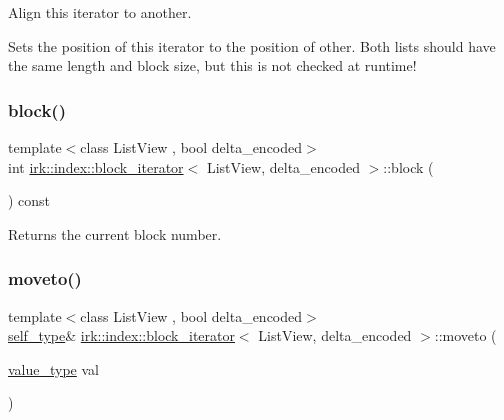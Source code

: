 Align this iterator to another. 

Sets the position of this iterator to the position of {\ttfamily other}. Both lists should have the same length and block size, but this is not checked at runtime! \mbox{\label{classirk_1_1index_1_1block__iterator_afc0c06615fcd46d243bccd2a6a77ffeb}} 
\subsubsection{\texorpdfstring{block()}{block()}}
{\footnotesize\ttfamily template$<$class List\+View , bool delta\+\_\+encoded$>$ \\
int \mbox{\hyperlink{classirk_1_1index_1_1block__iterator}{irk\+::index\+::block\+\_\+iterator}}$<$ List\+View, delta\+\_\+encoded $>$\+::block (\begin{DoxyParamCaption}{ }\end{DoxyParamCaption}) const\hspace{0.3cm}{\ttfamily [inline]}}



Returns the current block number. 

\mbox{\label{classirk_1_1index_1_1block__iterator_a7fd567ed2c5ece1ad02cf21957396c88}} 
\subsubsection{\texorpdfstring{moveto()}{moveto()}}
{\footnotesize\ttfamily template$<$class List\+View , bool delta\+\_\+encoded$>$ \\
\mbox{\hyperlink{classirk_1_1index_1_1block__iterator_a338ee8fee726492e9f8bbad4b4d75766}{self\+\_\+type}}\& \mbox{\hyperlink{classirk_1_1index_1_1block__iterator}{irk\+::index\+::block\+\_\+iterator}}$<$ List\+View, delta\+\_\+encoded $>$\+::moveto (\begin{DoxyParamCaption}\item[{\mbox{\hyperlink{classirk_1_1index_1_1block__iterator_a4d6c5b58cedd871e8a8f235e425e8587}{value\+\_\+type}}}]{val }\end{DoxyParamCaption})\hspace{0.3cm}{\ttfamily [inline]}}



